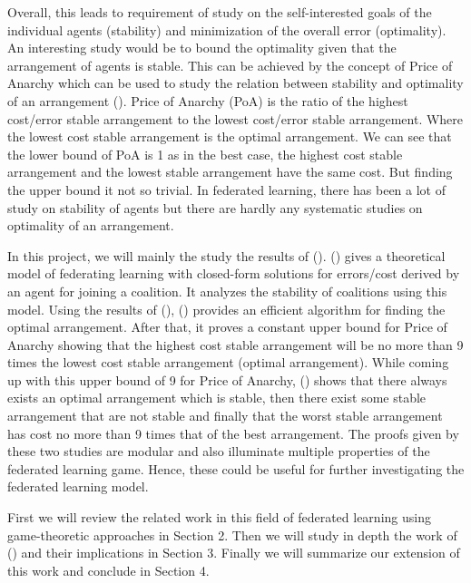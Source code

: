\documentclass{article}
\begin{document}
Overall, this leads to requirement of study on the self-interested goals of the individual agents (stability) and minimization of the overall error (optimality). An interesting study would be to bound the optimality given that the arrangement of agents is stable. This can be achieved by the concept of Price of Anarchy which can be used to study the relation between stability and optimality of an arrangement (\cite{koutsoupias1999worst, papadimitriou2001algorithms}). Price of Anarchy (PoA) is the ratio of the highest cost/error stable arrangement to the lowest cost/error stable arrangement. Where the lowest cost stable arrangement is the optimal arrangement. We can see that the lower bound of PoA is 1 as in the best case, the highest cost stable arrangement and the lowest stable arrangement have the same cost. But finding the upper bound it not so trivial. In federated learning, there has been a lot of study on stability of agents but there are hardly any systematic studies on optimality of an arrangement.

In this project, we will mainly the study the results of (\cite{donahue2021opt}). (\cite{donahue2020model}) gives a theoretical model of federating learning  with closed-form solutions for errors/cost derived by an agent for joining a coalition. It analyzes the stability of coalitions using this model. Using the results of (\cite{donahue2020model}), (\cite{donahue2021opt}) provides an efficient algorithm for finding the optimal arrangement. After that, it proves a constant upper bound for Price of Anarchy showing that the highest cost stable arrangement will be no more than 9 times the lowest cost stable arrangement (optimal arrangement). While coming up with this upper bound of 9 for Price of Anarchy, (\cite{donahue2021opt}) shows that there always exists an optimal arrangement which is stable, then there exist some stable arrangement that are not stable and finally that the worst stable arrangement has cost no more than 9 times that of the best arrangement. The proofs given by these two studies are modular and also illuminate multiple properties of the federated learning game. Hence, these could be useful for further investigating the federated learning model.

First we will review the related work in this field of federated learning using game-theoretic approaches in Section 2. Then we will study in depth the work of (\cite{donahue2021opt}) and their implications in Section 3. Finally we will summarize our extension of this work and conclude in Section 4.
\end{document}
